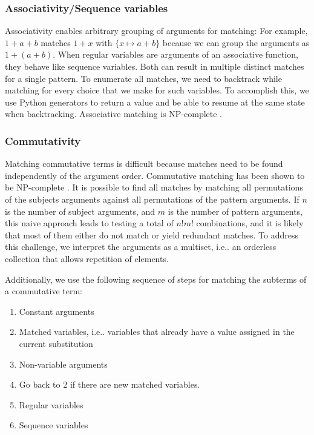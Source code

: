 \documentclass[conference,compsoc]{IEEEtran}
\makeatletter
\DeclareRobustCommand\onedot{\futurelet\@let@token\@onedot}
\def\@onedot{\ifx\@let@token.\else.\null\fi\xspace}
\def\ie{{i.e}\onedot} \def\Ie{{I.e}\onedot}
\newcommand{\regvar}[1]{#1}
\makeatother
\begin{document}

\subsubsection{Associativity/Sequence variables%
  \label{associativity-sequence-variables}%
}


Associativity enables arbitrary grouping of arguments for matching:
For example, $1 + a + b$ matches $1 + \regvar{x}$ with $\{ x \mapsto a + b \}$ because we can group the arguments as $1 + (a + b)$.
When regular variables are arguments of an associative function, they behave like sequence variables.
Both can result in multiple distinct matches for a single pattern.
To enumerate all matches, we need to backtrack while matching for every choice that we make for such variables.
To accomplish this, we use Python generators to return a value and be able to resume at the same state when backtracking.
Associative matching is NP-complete \cite{Benanav1987}.

\subsubsection{Commutativity%
  \label{commutativity}%
}


Matching commutative terms is difficult because matches need to be found independently of the argument order.
Commutative matching has been shown to be NP-complete \cite{Benanav1987}.
It is possible to find all matches by matching all permutations of the subjects arguments against all permutations of the pattern arguments.
If $n$ is the number of subject arguments, and $m$ is the number of pattern arguments,
this naive approach leads to testing a total of $n!m!$ combinations,
and it is likely that most of them either do not match or yield redundant matches.
To address this challenge, we interpret the arguments as a multiset, \ie an orderless collection that allows repetition of elements.

Additionally, we use the following sequence of steps for matching the subterms of a commutative term:
\begin{enumerate}
    \item Constant arguments
    \item Matched variables, \ie variables that already have a value assigned in the current substitution
    \item Non-variable arguments
    \item Go back to 2 if there are new matched variables.
    \item Regular variables
    \item Sequence variables
\end{enumerate}
\end{document}
